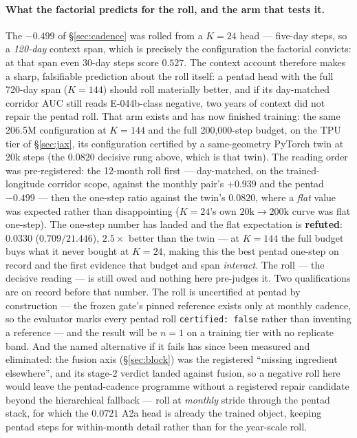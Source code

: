 \documentclass[10pt]{article}
\begin{document}
\paragraph{What the factorial predicts for the roll, and the arm that
tests it.} The $-0.499$ of \S\ref{sec:cadence} was rolled from a
$K{=}24$ head --- five-day steps, so a \emph{120-day} context span,
which is precisely the configuration the factorial convicts: at that
span even 30-day steps score $0.527$. The context account therefore
makes a sharp, falsifiable prediction about the roll itself: a pentad
head with the full 720-day span ($K{=}144$) should roll materially
better, and if its day-matched corridor AUC still reads
E-044b-class negative, two years of context did not repair the pentad
roll. That arm exists and has now finished training: the
same 206.5M configuration at $K{=}144$ and the full 200{,}000-step
budget, on the TPU tier of \S\ref{sec:jax}, its configuration
certified by a same-geometry PyTorch twin at 20k steps (the $0.0820$
decisive rung above, which is that twin). The reading order was
pre-registered: the 12-month roll first --- day-matched, on the
trained-longitude corridor scope, against the monthly pair's $+0.939$
and the pentad $-0.499$ --- then the one-step ratio against the twin's
$0.0820$, where a \emph{flat} value was expected rather than
disappointing ($K{=}24$'s own $20\mathrm{k}\to200\mathrm{k}$ curve
was flat one-step). The one-step number has landed and the flat
expectation is \textbf{refuted}: $\mathbf{0.0330}$
($0.709/21.446$), $2.5\times$ better than the twin --- at $K{=}144$
the full budget buys what it never bought at $K{=}24$, making this
the best pentad one-step on record and the first evidence that budget
and span \emph{interact}. The roll --- the decisive reading --- is
still owed and nothing here pre-judges it.
Two qualifications are on record before that
number. The roll is uncertified at pentad by construction --- the
frozen gate's pinned reference exists only at monthly cadence, so the
evaluator marks every pentad roll \texttt{certified: false} rather than
inventing a reference --- and the result
will be $n{=}1$ on a training tier with no replicate band. And the
named alternative if it fails has since been measured and eliminated:
the fusion axis (\S\ref{sec:block}) was the registered ``missing
ingredient elsewhere'', and its stage-2 verdict landed against fusion,
so a negative roll here would leave the pentad-cadence programme
without a registered repair candidate beyond the hierarchical
fallback --- roll at \emph{monthly} stride through the pentad stack,
for which the $0.0721$ A2a head is already the trained object, keeping
pentad steps for within-month detail rather than for the year-scale
roll.
\end{document}
